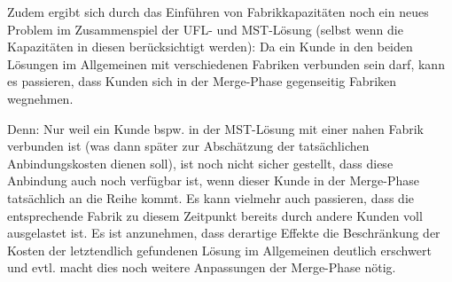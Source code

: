 \documentclass[a4paper,ngerman,11pt,bibtotoc]{scrartcl}
\theoremstyle{definition}
\theoremstyle{plain}
\theoremstyle{remark}
\newcommand{\MST}{MST}
\newcommand{\UFL}{UFL}
\begin{document}
Zudem ergibt sich durch das Einführen von Fabrikkapazitäten noch ein neues Problem im Zusammenspiel der \UFL- und \MST-Lösung (selbst wenn die Kapazitäten in diesen berücksichtigt werden): Da ein Kunde in den beiden Lösungen im Allgemeinen mit verschiedenen Fabriken verbunden sein darf, kann es passieren, dass Kunden sich in der Merge-Phase gegenseitig Fabriken \glqq wegnehmen\grqq. 

Denn: Nur weil ein Kunde bspw. in der \MST-Lösung mit einer nahen Fabrik verbunden ist (was dann später zur Abschätzung der tatsächlichen Anbindungskosten dienen soll), ist noch nicht sicher gestellt, dass diese Anbindung auch noch verfügbar ist, wenn dieser Kunde in der Merge-Phase tatsächlich an die Reihe kommt. Es kann vielmehr auch passieren, dass die entsprechende Fabrik zu diesem Zeitpunkt bereits durch andere Kunden voll ausgelastet ist. Es ist anzunehmen, dass derartige Effekte die Beschränkung der Kosten der letztendlich gefundenen Lösung im Allgemeinen deutlich erschwert und evtl. macht dies noch weitere Anpassungen der Merge-Phase nötig.

\newpage	

\newpage
\nocite{*}
\printbibliography		
			
\end{document}
